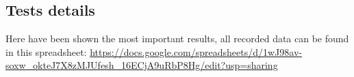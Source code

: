 	\subsection{Tests details}
		Here have been shown the most important results, all recorded data can be found in this spreadsheet: \url{https://docs.google.com/spreadsheets/d/1wJ98av-soxw_okteJ7X8zMJUfesh_16ECjA9uRbP8Hg/edit?usp=sharing} 
		